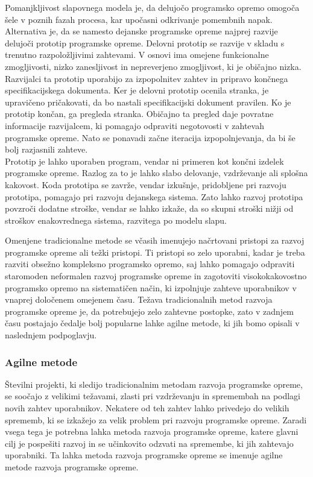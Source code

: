 \documentclass[a4paper,12pt,openright]{book}
\begin{document}
Pomanjkljivost slapovnega modela je, da delujočo programsko opremo omogoča šele v poznih fazah procesa, kar upočasni odkrivanje pomembnih napak. Alternativa je, da se namesto dejanske programske opreme najprej razvije delujoči prototip programske opreme. Delovni prototip se razvije v skladu s trenutno razpoložljivimi zahtevami. V osnovi ima omejene funkcionalne zmogljivosti, nizko zanesljivost in nepreverjeno zmogljivost, ki je običajno nizka. \\
Razvijalci ta prototip uporabijo za izpopolnitev zahtev in pripravo končnega specifikacijskega dokumenta. Ker je delovni prototip ocenila stranka, je upravičeno pričakovati, da bo nastali specifikacijski dokument pravilen. Ko je prototip končan, ga pregleda stranka. Običajno ta pregled daje povratne informacije razvijalcem, ki pomagajo odpraviti negotovosti v zahtevah programske opreme. Nato se ponavadi začne iteracija izpopolnjevanja, da bi še bolj razjasnili zahteve. \\
Prototip je lahko uporaben program, vendar ni primeren kot končni izdelek programske opreme. Razlog za to je lahko slabo delovanje, vzdrževanje ali splošna kakovost. Koda prototipa se zavrže, vendar izkušnje, pridobljene pri razvoju prototipa, pomagajo pri razvoju dejanskega sistema. Zato lahko razvoj prototipa povzroči dodatne stroške, vendar se lahko izkaže, da so skupni stroški nižji od stroškov enakovrednega sistema, razvitega po modelu slapu. \cite{aggarwal2005software}

Omenjene tradicionalne metode se včasih imenujejo načrtovani pristopi za razvoj programske opreme ali težki pristopi. Ti pristopi so zelo uporabni, kadar je treba razviti obsežno kompleksno programsko opremo, saj lahko pomagajo odpraviti staromoden neformalen razvoj programske opreme in zagotoviti visokokakovostno programsko opremo na sistematičen način, ki izpolnjuje zahteve uporabnikov v vnaprej določenem omejenem času. Težava tradicionalnih metod razvoja programske opreme je, da potrebujejo zelo zahtevne postopke, zato v zadnjem času postajajo čedalje bolj popularne lahke agilne metode, ki jih bomo opisali v naslednjem podpoglavju.


\subsubsection{Agilne metode}
\sloppy
Številni projekti, ki sledijo tradicionalnim metodam razvoja programske opreme, se soočajo z velikimi težavami, zlasti pri vzdrževanju in spremembah na podlagi novih zahtev uporabnikov. Nekatere od teh zahtev lahko privedejo do velikih sprememb, ki se izkažejo za velik problem pri razvoju programske opreme.  Zaradi vsega tega je potrebna lahka metoda razvoja programske opreme, katere glavni cilj je pospešiti razvoj in se učinkovito odzvati na spremembe, ki jih zahtevajo uporabniki. Ta lahka metoda razvoja programske opreme se imenuje agilne metode razvoja programske opreme. 
\cite{AlSaqqa2020AgileSD}
\end{document}
